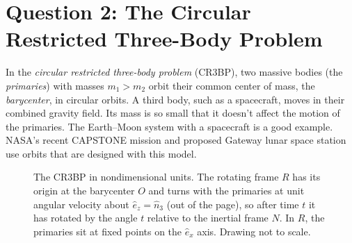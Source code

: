 \documentclass[11pt,letterpaper]{article}
\newcommand{\br}{\mathbf{r}}
\begin{document}
\section*{Question 2: The Circular Restricted Three-Body Problem}

In the \emph{circular restricted three-body problem} (CR3BP), two massive bodies (the \emph{primaries}) with masses $m_1 > m_2$ orbit their common center of mass, the \emph{barycenter}, in circular orbits. A third body, such as a spacecraft, moves in their combined gravity field. Its mass is so small that it doesn't affect the motion of the primaries. The Earth--Moon system with a spacecraft is a good example. NASA's recent CAPSTONE mission and proposed Gateway lunar space station use orbits that are designed with this model.

\begin{figure}[h]
\centering
{}
\caption{The CR3BP in nondimensional units. The rotating frame $R$ has its origin at the barycenter $O$ and turns with the primaries at unit angular velocity about $\hat e_z = \hat n_3$ (out of the page), so after time $t$ it has rotated by the angle $t$ relative to the inertial frame $N$. In $R$, the primaries sit at fixed points on the $\hat e_x$ axis. Drawing not to scale.}
\label{fig:cr3bp}
\end{figure}
\end{document}
